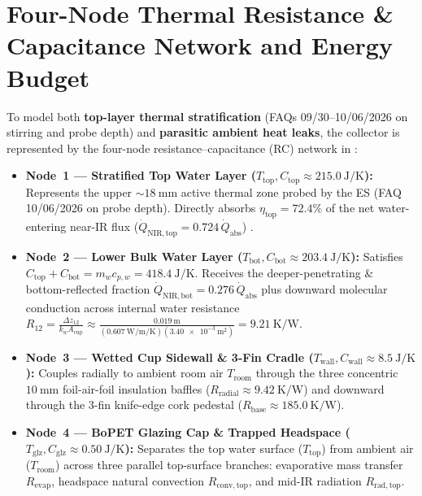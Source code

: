 \section{Four-Node Thermal Resistance \& Capacitance Network and Energy Budget}\label{sec:15.4}

To model both \textbf{top-layer thermal stratification} (FAQs 09/30--10/06/2026 on stirring and probe depth) and \textbf{parasitic ambient heat leaks}, the collector is represented by the four-node resistance--capacitance (RC) network in :
\begin{itemize}
  \item \textbf{Node~1 --- Stratified Top Water Layer ($T_{\mathrm{top}}, C_{\mathrm{top}} \approx \SI{215.0}{\joule\per\kelvin}$):} Represents the upper $\sim\SI{18}{\milli\meter}$ active thermal zone probed by the ES (FAQ 10/06/2026 on probe depth). Directly absorbs $\eta_{\mathrm{top}} = 72.4\%$ of the net water-entering near-IR flux ($\dot{Q}_{\mathrm{NIR,top}} = 0.724\,\dot{Q}_{\mathrm{abs}}$) .
  \item \textbf{Node~2 --- Lower Bulk Water Layer ($T_{\mathrm{bot}}, C_{\mathrm{bot}} \approx \SI{203.4}{\joule\per\kelvin}$):} Satisfies $C_{\mathrm{top}} + C_{\mathrm{bot}} = m_w c_{p,w} = \SI{418.4}{\joule\per\kelvin}$. Receives the deeper-penetrating \& bottom-reflected fraction $\dot{Q}_{\mathrm{NIR,bot}} = 0.276\,\dot{Q}_{\mathrm{abs}}$ plus downward molecular conduction across internal water resistance $R_{12} = \frac{\Delta z_{12}}{k_w A_{\mathrm{cup}}} \approx \frac{\SI{0.019}{\meter}}{(\SI{0.607}{\watt\per\meter\per\kelvin})(\SI{3.40e-3}{\square\meter})} = \SI{9.21}{\kelvin\per\watt}$.
  \item \textbf{Node~3 --- Wetted Cup Sidewall \& 3-Fin Cradle ($T_{\mathrm{wall}}, C_{\mathrm{wall}} \approx \SI{8.5}{\joule\per\kelvin}$):} Couples radially to ambient room air $T_{\mathrm{room}}$ through the three concentric $\SI{10}{\milli\meter}$ foil-air-foil insulation baffles ($R_{\mathrm{radial}} \approx \SI{9.42}{\kelvin\per\watt}$) and downward through the 3-fin knife-edge cork pedestal ($R_{\mathrm{base}} \approx \SI{185.0}{\kelvin\per\watt}$).
  \item \textbf{Node~4 --- BoPET Glazing Cap \& Trapped Headspace ($T_{\mathrm{glz}}, C_{\mathrm{glz}} \approx \SI{0.50}{\joule\per\kelvin}$):} Separates the top water surface ($T_{\mathrm{top}}$) from ambient air ($T_{\mathrm{room}}$) across three parallel top-surface branches: evaporative mass transfer $R_{\mathrm{evap}}$, headspace natural convection $R_{\mathrm{conv,top}}$, and mid-IR radiation $R_{\mathrm{rad,top}}$.
\end{itemize}

